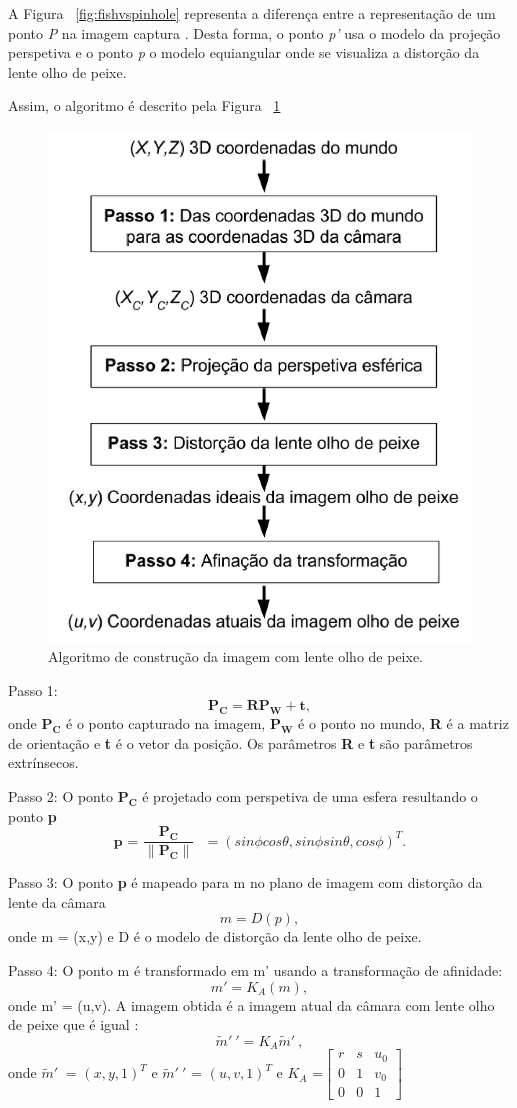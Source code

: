 A Figura ~\ref{fig:fishvspinhole} representa a diferença entre a representação de um ponto \textit{P} na imagem captura . Desta forma, o ponto \textit{p'} usa o modelo da projeção perspetiva e o ponto \textit{p} o modelo equiangular onde se visualiza a distorção da lente olho de peixe.

Assim, o algoritmo é descrito pela Figura ~\ref{fig:fisheyealgortim}

\begin{figure}[h!]
	\centering
	\includegraphics[width=0.4\linewidth]{figures/fisheyealgortimpt}
	\caption{Algoritmo de construção da imagem com lente olho de peixe. \cite{Ying2006}}
	\label{fig:fisheyealgortim}
\end{figure}

Passo 1:  \[ \textbf{P}_\textbf{C} = \textbf{R}\textbf{P}_\textbf{W} + \textbf{t} , \] onde $\textbf{P}_\textbf{C}$ é o ponto capturado na imagem, $\textbf{P}_\textbf{W}$ é o ponto no mundo, \textbf{R} é a matriz de orientação e \textbf{t} é o vetor da posição. Os parâmetros \textbf{R} e \textbf{t} são parâmetros extrínsecos. 

Passo 2: O ponto $\textbf{P}_\textbf{C}$ é projetado com perspetiva de uma esfera resultando o ponto \textbf{p} \[ \textbf{p = $\frac{\textbf{P}_\textbf{C}}{ \| \textbf{P}_\textbf{C} \| }$ } = ( sin \phi cos \theta, sin \phi sin \theta, cos \phi)^T  . \]

Passo 3: O ponto \textbf{p} é mapeado para m no plano de imagem com distorção da lente da câmara \[ m = D(p) , \] onde m = (x,y) e D é o modelo de distorção da lente olho de peixe. 

Passo 4: O ponto m é transformado em m' usando a transformação de afinidade: \[ m' = K_A(m) , \] onde m' = (u,v). A imagem obtida é a imagem atual da câmara com lente olho de peixe que é igual : \[ \widetilde{m}'\ ' = K_A \widetilde{m}'\  ,\] onde $\widetilde{m}'\ $ = $(x,y,1)^T$ e $\widetilde{m}'\ '$ = $(u,v,1)^T$ e $K_A$ =$\left[ \begin{array}{ccc}
	r & s & u_0 \\ 
	0 & 1 & v_0 \\ 
	0 & 0 & 1
\end{array} \right]$ 


